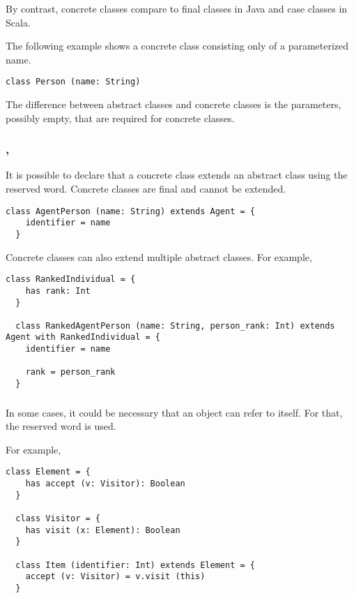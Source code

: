 By contrast, concrete classes compare to final classes in Java and case classes in Scala.

The following example shows a concrete class consisting only of a parameterized name.
\begin{lstlisting}[label={lst:exampleConcreteClass}]
  class Person (name: String)
\end{lstlisting}

The difference between abstract classes and concrete classes is the parameters, possibly empty, that are required for concrete classes.

\subsubsection{\sextends, \swith}

It is possible to declare that a concrete class extends an abstract class using the \sextends reserved word.
Concrete classes are final and cannot be extended.

\begin{lstlisting}[label={lst:exampleExtends}]
  class AgentPerson (name: String) extends Agent = {
    identifier = name
  }
\end{lstlisting}

Concrete classes can also extend multiple abstract classes.
For example,
\begin{lstlisting}[label={lst:exampleWith}]
  class RankedIndividual = {
    has rank: Int
  }

  class RankedAgentPerson (name: String, person_rank: Int) extends Agent with RankedIndividual = {
    identifier = name

    rank = person_rank
  }
\end{lstlisting}

\subsubsection{\sthis}

In some cases, it could be necessary that an object can refer to itself.
For that, the \sthis reserved word is used.

For example,
\begin{lstlisting}[label={lst:exampleExtendsElement}]
  class Element = {
    has accept (v: Visitor): Boolean
  }

  class Visitor = {
    has visit (x: Element): Boolean
  }

  class Item (identifier: Int) extends Element = {
    accept (v: Visitor) = v.visit (this)
  }
\end{lstlisting}

